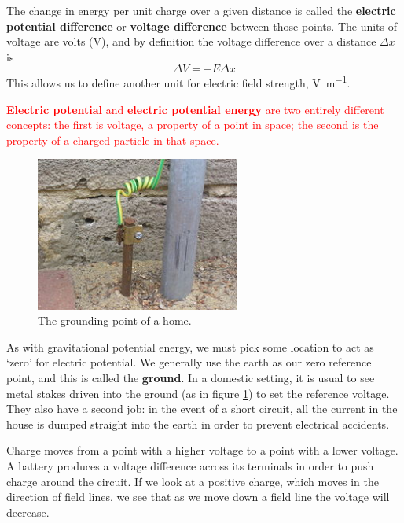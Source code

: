 \documentclass[a4paper]{amsbook}
\newcommand\capcite[1]{}
\begin{document}
The change in energy per unit charge over a given distance is called the \textbf{electric potential difference} or \textbf{voltage difference}
between those points. The units of voltage are volts (V), and by definition the voltage difference over a distance $ \Delta x $ is
\begin{equation}
  \Delta V = -E \Delta x
\end{equation}
This allows us to define another unit for electric field strength, \si{\volt\per\metre}.

\textcolor{red}{\textbf{Electric potential} and \textbf{electric potential energy} are two entirely different concepts: the first is voltage,
a property of a point in space; the second is the property of a charged particle in that space.}

\begin{figure}
  \centering
  \includegraphics[width=0.6\textwidth]{ground}
  \caption{The grounding point of a home. \capcite{https://upload.wikimedia.org/wikipedia/commons/thumb/7/7d/HomeEarthRodAustralia1.jpg/250px-HomeEarthRodAustralia1.jpg}\label{fig:ground}}
\end{figure}

As with gravitational potential energy, we must pick some location to act as `zero' for electric potential. We generally use the earth
as our zero reference point, and this is called the \textbf{ground}. In a domestic setting, it is usual to see metal stakes driven into
the ground (as in figure \ref{fig:ground}) to set the reference voltage. They also have a second job: in the event of a short circuit,
all the current in the house is dumped straight into the earth in order to prevent electrical accidents.

Charge moves from a point with a higher voltage to a point with a lower voltage. A battery produces a voltage difference across its terminals
in order to push charge around the circuit. If we look at a positive charge, which moves in the direction of field lines, we see that as we move
down a field line the voltage will decrease.
\end{document}
